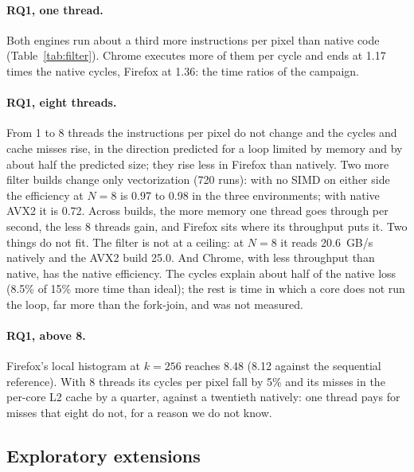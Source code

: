 \documentclass[sigplan]{acmart}
\begin{document}
\paragraph{RQ1, one thread.} Both engines run about a third more
instructions per pixel than native code (Table~\ref{tab:filter}). Chrome
executes more of them per cycle and ends at 1.17 times the native cycles,
Firefox at 1.36: the time ratios of the campaign.

\paragraph{RQ1, eight threads.} From 1 to 8 threads the instructions per
pixel do not change and the cycles and cache misses rise, in the direction
predicted for a loop limited by memory and by about half the predicted
size; they rise less in Firefox than natively. Two more filter builds
change only vectorization (720 runs): with no SIMD on either side the
efficiency at $N=8$ is 0.97 to 0.98 in the three environments; with native
AVX2 it is 0.72. Across builds, the more memory one thread goes through per
second, the less 8 threads gain, and Firefox sits where its throughput puts
it. Two things do not fit. The filter is not at a ceiling: at $N=8$ it
reads 20.6~GB/s natively and the AVX2 build 25.0. And Chrome, with less
throughput than native, has the native efficiency. The cycles explain about
half of the native loss (8.5\% of 15\% more time than ideal); the rest is
time in which a core does not run the loop, far more than the fork-join,
and was not measured.

\paragraph{RQ1, above 8.} Firefox's local histogram at $k=256$ reaches 8.48
(8.12 against the sequential reference). With 8 threads its cycles per
pixel fall by 5\% and its misses in the per-core L2 cache by a quarter,
against a twentieth natively: one thread pays for misses that eight do
not, for a reason we do not know.

\subsection{Exploratory extensions}
\label{sec:extensions}
\end{document}
